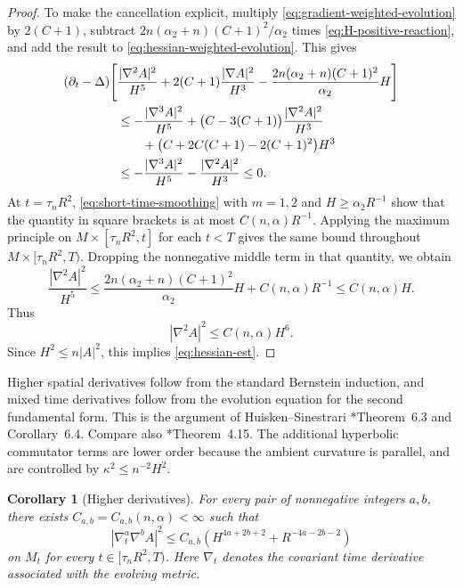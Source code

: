 \documentclass[11pt,reqno]{amsart}
\newtheorem{corollary}[proposition]{Corollary}
\theoremstyle{definition}
\theoremstyle{remark}
\numberwithin{equation}{section}
\begin{document}
\begin{proof}
  To make the cancellation explicit, multiply
  \eqref{eq:gradient-weighted-evolution} by $2(C+1)$, subtract
  $2n(\alpha_2+n)(C+1)^2/\alpha_2$ times
  \eqref{eq:H-positive-reaction}, and add the result to
  \eqref{eq:hessian-weighted-evolution}.  This gives
  \begin{align*}
  (\partial_t-\Delta)\Bigg[
  &\frac{|\nabla^2A|^2}{H^5}
  +2(C+1)\frac{|\nabla A|^2}{H^3} -\frac{2n(\alpha_2+n)(C+1)^2}{\alpha_2}H
  \Bigg]\notag\\
  &\leq
  -\frac{|\nabla^3A|^2}{H^5}
  +\bigl(C-3(C+1)\bigr)\frac{|\nabla^2A|^2}{H^3}\notag\\
  &\qquad
  +\bigl(C+2C(C+1)-2(C+1)^2\bigr)H^3\\
  &\leq
  -\frac{|\nabla^3A|^2}{H^5}
  -\frac{|\nabla^2A|^2}{H^3}
  \leq0.
  \end{align*}
  At $t=\tau_nR^2$, \eqref{eq:short-time-smoothing} with $m=1,2$ and
  $H\geq\alpha_2R^{-1}$ show that the quantity in square brackets is at
  most $C(n,\alpha)R^{-1}$.
  Applying the maximum principle on $M\times[\tau_nR^2,t]$ for each $t<T$
  gives the same bound throughout $M\times[\tau_nR^2,T)$.  Dropping the nonnegative
  middle term in that quantity, we obtain
  \begin{equation*}
  \frac{|\nabla^2A|^2}{H^5}
  \leq
  \frac{2n(\alpha_2+n)(C+1)^2}{\alpha_2}H
  +C(n,\alpha)R^{-1}
  \leq C(n,\alpha)H.
  \end{equation*}
  Thus
  \begin{equation*}
  |\nabla^2A|^2\leq C(n,\alpha)H^6.
  \end{equation*}
  Since $H^2\leq n|A|^2$, this implies
  \eqref{eq:hessian-est}.
\end{proof}

Higher spatial derivatives follow from the standard Bernstein induction, and
mixed time derivatives follow from the evolution equation for the second
fundamental form.  This is the argument of Huisken--Sinestrari
\cite{HS09}*{Theorem~6.3 and Corollary~6.4}.  Compare also
\cite{LN21}*{Theorem~4.15}.  The additional hyperbolic commutator terms are
lower order because the ambient curvature is parallel, and are controlled by
$\kappa^2\leq n^{-2}H^2$.

\begin{corollary}[Higher derivatives]\label{cor:higher-derivatives}
  For every pair of nonnegative integers $a,b$, there exists
  $C_{a,b}=C_{a,b}(n,\alpha)<\infty$ such that
  \begin{equation}\label{eq:higher-derivative-estimate}
    |\nabla_t^a\nabla^bA|^2
    \leq
    C_{a,b}\left(
    H^{4a+2b+2}+R^{-4a-2b-2}
    \right)
  \end{equation}
  on $M_t$ for every $t\in[\tau_nR^2,T)$.  Here $\nabla_t$ denotes the
  covariant time derivative associated with the evolving metric.
\end{corollary}
\end{document}
